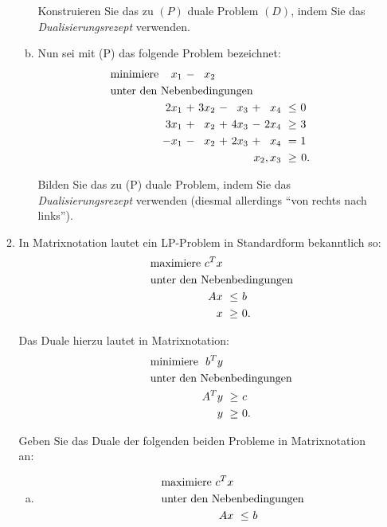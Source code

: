 \documentclass[11pt, a4paper]{article}
\begin{document}
\begin{enumerate}[\bfseries A:]
\begin{enumerate}[\bfseries 1.]
\begin{enumerate}[a)]
Konstruieren Sie das zu $(P)$ duale Problem $(D)$, indem Sie das \textit{Dualisierungsrezept} verwenden.

\item Nun sei mit (P) das folgende Problem bezeichnet:
\begin{align*}
\begin{alignedat}{6}
& \text{minimiere } & x_1 &\ - &\ x_2 & & & & & & \\ 
& \rlap{unter den Nebenbedingungen} & & & & & & & & & \\
&& 2x_1 &\ + &\ 3x_2 &\ - &\  x_3 &\ + &\  x_4 &\ \leq &\ 0\ \\
&& 3x_1 &\ + &\  x_2 &\ + &\ 4x_3 &\ - &\ 2x_4 &\ \geq &\ 3\ \\
&& -x_1 &\ - &\  x_2 &\ + &\ 2x_3 &\ + &\  x_4 &\ =    &\ 1\ \\
&&&&&&&& \llap{$x_2,x_3$} &\ \geq &\ 0.
\end{alignedat}
\end{align*}

Bilden Sie das zu (P) duale Problem, indem Sie das \textit{Dualisierungsrezept} verwenden (diesmal allerdings \enquote{von rechts nach links}).
\end{enumerate}

\item In Matrixnotation lautet ein LP-Problem in Standardform bekanntlich so:
\begin{align*}
\begin{alignedat}{3}
& \text{maximiere } & c^Tx & & \\
& \rlap{unter den Nebenbedingungen} & & & \\
&& Ax &\ \leq &\ b\ \\
&& x &\ \geq &\ 0.
\end{alignedat}
\end{align*}

Das Duale hierzu lautet in Matrixnotation:
\begin{align*}
\begin{alignedat}{3}
& \text{minimiere } & b^Ty & & \\
& \rlap{unter den Nebenbedingungen} & & & \\
&& A^Ty &\ \geq &\ c\ \\
&& y &\ \geq &\ 0.
\end{alignedat}
\end{align*}

\pagebreak
Geben Sie das Duale der folgenden beiden Probleme in Matrixnotation an:
\begin{enumerate}[a)]
\item \begin{align*}
\begin{alignedat}{3}
& \text{maximiere } & c^Tx & & \\
& \rlap{unter den Nebenbedingungen} & & & \\
&& Ax &\ \leq &\ b
\end{alignedat}
\end{align*}


\end{enumerate}
\end{enumerate}
\end{enumerate}
\end{document}
